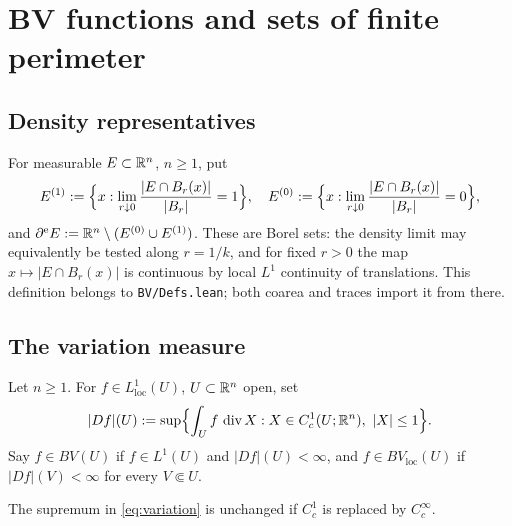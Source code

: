 \chapter{BV functions and sets of finite perimeter}\label{ch:bv}

\section{Density representatives}

\begin{definition}\label{def:density}
For measurable $E\subset\mathbb R^n$, $n\ge1$, put
\[
  E^{(1)}:=\Bigl\{x:\lim_{r\downarrow0}\frac{|E\cap B_r(x)|}{|B_r|}=1\Bigr\},
  \quad
  E^{(0)}:=\Bigl\{x:\lim_{r\downarrow0}\frac{|E\cap B_r(x)|}{|B_r|}=0\Bigr\},
\]
and $\partial^{\mathrm e} E:=\mathbb R^n\setminus(E^{(0)}\cup E^{(1)})$.  These are Borel sets:
the density limit may equivalently be tested along $r=1/k$, and for fixed
$r>0$ the map $x\mapsto|E\cap B_r(x)|$ is continuous by local $L^1$
continuity of translations.  This definition belongs to
\texttt{BV/Defs.lean}; both coarea and traces import it from there.
\end{definition}

\section{The variation measure}

\begin{definition}[Variation]\label{def:variation}
Let $n\ge1$.  For $f\in L^1_{\mathrm{loc}}(U)$,
$U\subset\mathbb R^n$ open, set
\begin{equation}\label{eq:variation}
  |Df|(U):=\sup\Bigl\{\int_Uf\,\operatorname{div} X:
    X\in C^1_c(U;\mathbb R^n),\ |X|\le1\Bigr\}.
\end{equation}
Say $f\in BV(U)$ if $f\in L^1(U)$ and $|Df|(U)<\infty$, and
$f\in BV_{\mathrm{loc}}(U)$ if $|Df|(V)<\infty$ for every $V\Subset U$.
\end{definition}

\begin{lemma}\label{lem:test-class}
The supremum in \eqref{eq:variation} is unchanged if $C^1_c$ is replaced by
$C^\infty_c$.
\end{lemma}


